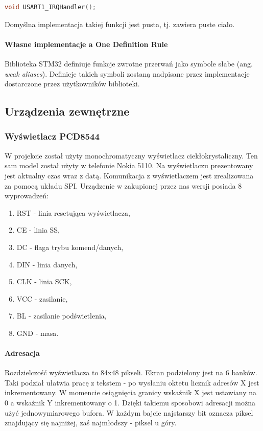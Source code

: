 \documentclass{article}
\begin{document}
\begin{center}
\begin{lstlisting}[language=C, basicstyle=\footnotesize]
void USART1_IRQHandler();
\end{lstlisting}
\end{center}

Domyślna implementacja takiej funkcji jest pusta, tj. zawiera puste ciało.

\paragraph{Własne implementacje a One Definition Rule}
Biblioteka STM32 definiuje funkcje zwrotne przerwań jako symbole słabe
(ang. \emph{weak aliases}). Definicje takich symboli zostaną nadpisane przez
implementacje dostarczone przez użytkowników biblioteki.

\subsection{Urządzenia zewnętrzne}
\subsubsection{Wyświetlacz PCD8544}

W projekcie został użyty monochromatyczny wyświetlacz ciekłokrystaliczny. Ten sam model
został użyty w telefonie Nokia 5110. Na wyświetlaczu prezentowany jest aktualny czas wraz z datą.
Komunikacja z wyświetlaczem jest zrealizowana za pomocą układu SPI.
Urządzenie w zakupionej przez nas wersji posiada 8 wyprowadzeń:

\begin{enumerate}
    \item RST - linia resetująca wyświetlacza,
    \item CE - linia SS,
    \item DC - flaga trybu komend/danych,
    \item DIN - linia danych,
    \item CLK - linia SCK,
    \item VCC - zasilanie,
    \item BL - zasilanie podświetlenia,
    \item GND - masa.
\end{enumerate}

\paragraph{Adresacja}
Rozdzielczość wyświetlacza to 84x48 pikseli. Ekran podzielony jest na 6 banków.
Taki podział ułatwia pracę z tekstem - po wysłaniu oktetu licznik adresów
X jest inkrementowany. W momencie osiągnięcia granicy wskaźnik X jest ustawiany na
0 a wskaźnik Y inkrementowany o 1. Dzięki takiemu sposobowi adresacji można użyć
jednowymiarowego bufora. W każdym bajcie najstarszy bit oznacza piksel znajdujący się najniżej,
zaś najmłodszy - piksel u góry.
\end{document}

